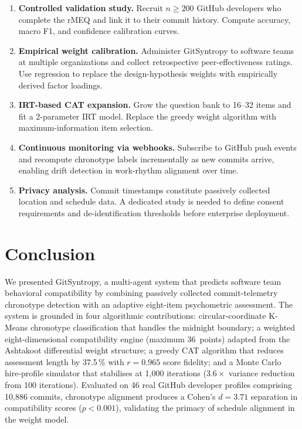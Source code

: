 \documentclass[conference]{IEEEtran}
\begin{document}
\begin{enumerate}
  \item \textbf{Controlled validation study.}  Recruit $n \geq 200$
    GitHub developers who complete the rMEQ and link it to their
    commit history.  Compute accuracy, macro F1, and confidence
    calibration curves.

  \item \textbf{Empirical weight calibration.}  Administer
    GitSyntropy to software teams at multiple organizations and
    collect retrospective peer-effectiveness ratings.  Use
    regression to replace the design-hypothesis weights with
    empirically derived factor loadings.

  \item \textbf{IRT-based CAT expansion.}  Grow the question bank
    to 16--32 items and fit a 2-parameter IRT model.  Replace the
    greedy weight algorithm with maximum-information item selection.

  \item \textbf{Continuous monitoring via webhooks.}  Subscribe to
    GitHub push events and recompute chronotype labels incrementally
    as new commits arrive, enabling drift detection in work-rhythm
    alignment over time.

  \item \textbf{Privacy analysis.}  Commit timestamps constitute
    passively collected location and schedule data.  A dedicated
    study is needed to define consent requirements and
    de-identification thresholds before enterprise deployment.
\end{enumerate}

\section{Conclusion}
\label{sec:conclusion}

We presented GitSyntropy, a multi-agent system that predicts software
team behavioral compatibility by combining passively collected
commit-telemetry chronotype detection with an adaptive eight-item
psychometric assessment.  The system is grounded in four algorithmic
contributions: circular-coordinate K-Means chronotype classification
that handles the midnight boundary; a weighted eight-dimensional
compatibility engine (maximum 36~points) adapted from the Ashtakoot
differential weight structure; a greedy CAT algorithm that reduces
assessment length by 37.5\,\% with $r = 0.965$ score fidelity; and
a Monte Carlo hire-profile simulator that stabilises at 1,000
iterations ($3.6\times$ variance reduction from 100 iterations).
Evaluated on 46 real GitHub developer profiles comprising 10,886
commits, chronotype alignment produces a Cohen's $d = 3.71$
separation in compatibility scores ($p < 0.001$), validating the
primacy of schedule alignment in the weight model.
\end{document}
